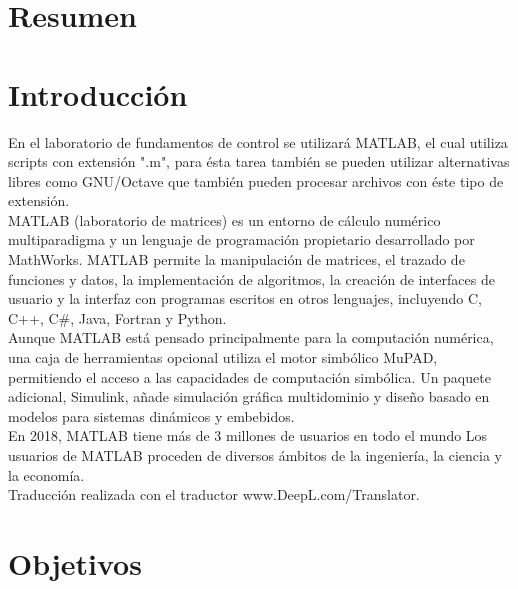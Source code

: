 \documentclass[]{article}
\begin{document}

\tableofcontents  %


\section{Resumen}

\section{Introducción}

En el laboratorio de fundamentos de control se utilizará MATLAB, el cual utiliza scripts con extensión ".m", para ésta tarea también se pueden utilizar alternativas libres como GNU/Octave que también pueden procesar archivos con éste tipo de extensión.\\

MATLAB (laboratorio de matrices) es un entorno de cálculo numérico multiparadigma y un lenguaje de programación propietario desarrollado por MathWorks. MATLAB permite la manipulación de matrices, el trazado de funciones y datos, la implementación de algoritmos, la creación de interfaces de usuario y la interfaz con programas escritos en otros lenguajes, incluyendo C, C++, C$\#$, Java, Fortran y Python.\cite{MATLABWiki}\\

Aunque MATLAB está pensado principalmente para la computación numérica, una caja de herramientas opcional utiliza el motor simbólico MuPAD, permitiendo el acceso a las capacidades de computación simbólica. Un paquete adicional, Simulink, añade simulación gráfica multidominio y diseño basado en modelos para sistemas dinámicos y embebidos.\cite{MATLABWiki}\\

En 2018, MATLAB tiene más de 3 millones de usuarios en todo el mundo Los usuarios de MATLAB proceden de diversos ámbitos de la ingeniería, la ciencia y la economía.\cite{MATLABWiki}\\ 

Traducción realizada con el traductor www.DeepL.com/Translator.\cite{Deepl}

\section{Objetivos}
\end{document}
